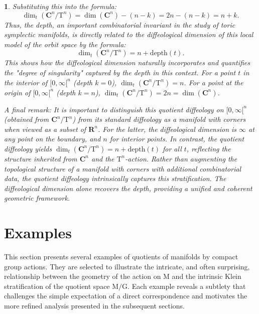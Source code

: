 \documentclass[10pt,reqno,letterpaper,twoside]{amsart}
\theoremstyle{article}
\newtheorem{article}{}
\newcommand{\RR}{\mathbf{R}}
\newcommand{\CC}{\mathbf{C}}
\def \G{\mathrm G}
\def \M{\mathrm M}
\def \T{\mathrm T}
\begin{document}
\begin{article}
    Substituting this into the formula:
    $$
      \dim_t(\CC^n/\T^n) = \dim(\CC^n) - (n-k) = 2n - (n-k) = n+k.
      $$
    Thus,
    the depth,
    an important combinatorial invariant in the study of toric symplectic manifolds,
    is directly related to the diffeological dimension of this local model of the orbit space by the formula:
    $$
      \dim_t(\CC^n/\T^n) = n + \mathrm{depth}(t).
      $$
    This shows how the diffeological dimension naturally incorporates and quantifies the "degree of singularity" captured by the depth in this context.
    For a point $t$ in the interior of $[0,\infty[^n$ (depth $k=0$),
    $\dim_t(\CC^n/\T^n) = n$.
    For a point at the origin of $[0,\infty[^n$ (depth $k=n$),
    $\dim_t(\CC^n/\T^n) = 2n = \dim(\CC^n)$.
    
    A final remark:
    It is important to distinguish this quotient diffeology on $[0,\infty[^n$
    (obtained from $\CC^n/\T^n$)
    from its standard diffeology as a manifold with corners when viewed as a subset of $\RR^n$.
    For the latter,
    the diffeological dimension is $\infty$ at any point on the boundary,
    and $n$ for interior points.
    In contrast,
    the quotient diffeology yields $\dim_t(\CC^n/\T^n) = n + \mathrm{depth}(t)$ for all $t$,
    reflecting the structure inherited from $\CC^n$ and the $\T^n$-action.
    Rather than augmenting the topological structure of a manifold with corners with additional combinatorial data,
    the quotient diffeology intrinsically captures this stratification.
    The diffeological dimension alone recovers the depth,
    providing a unified and coherent geometric framework.
    
  \end{article}
  
  \section{Examples}
  \label{sec:Examples}
  
  This section presents several examples of quotients of manifolds by compact group actions.
  They are selected to illustrate the intricate, and often surprising, relationship between the geometry of the action on $\M$ and the intrinsic Klein stratification of the quotient space $\M/\G$.
  Each example reveals a subtlety that challenges the simple expectation of a direct correspondence and motivates the more refined analysis presented in the subsequent sections.
  
\end{document}
